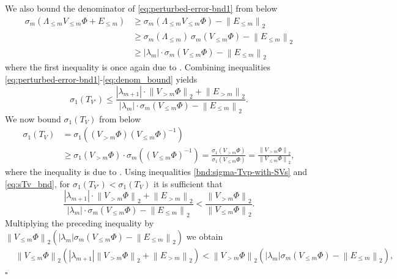 \documentclass[10pt,preprint]{elsarticle}
\newenvironment{proof}{{\noindent \bf \em Proof:}}{\hfill$\square$}
\newcommand{\norm}[1]{\left \lVert #1 \right \rVert }
\newcommand{\Llm}{\Lambda_{\le m}}
\begin{document}
\begin{proof}
%
We also bound the denominator of \eqref{eq:perturbed-error-bnd1} from below 
\begin{equation} \label{eq:denom_bound}
\begin{aligned}
\sigma_m\left(\Llm V_{\leq m} \Phi + E_{\leq m}\right) 
&\geq \sigma_m\left(\Llm V_{\leq m} \Phi\right) - \norm{E_{\leq m}}_2 \\
&\geq \sigma_m(\Llm)\ \sigma_m(V_{\leq m} \Phi)
 - \norm{E_{\leq m}}_2 \\
&\geq |\lambda_m| \cdot \sigma_m(V_{\leq m} \Phi) - \norm{E_{\leq m}}_2
\end{aligned}
\end{equation} 
where the first inequality is once again due to \cite[Theorem 1]{stewart1998perturbation}. Combining inequalities \eqref{eq:perturbed-error-bnd1}-\eqref{eq:denom_bound} yields 
\begin{equation} \label{bnd:sigma-Tvp-with-SVs}
\sigma_1(T_{V'}) \leq \frac{|\lambda_{m+1}| \cdot \norm{V_{>m} \Phi}_2 + \norm{E_{>m}}_2}{|\lambda_m| \cdot \sigma_m(V_{\leq m} \Phi) - \norm{E_{\leq m}}_2}. 
\end{equation}
%
We now bound $\sigma_1(T_V)$ from below 
\begin{equation} \label{eq:sTv_bnd}
\begin{aligned}
\sigma_1(T_V) &= \sigma_1\left((V_{>m}\Phi) (V_{\leq m}\Phi)^{-1}\right) \\ 
&\geq \sigma_1(V_{>m} \Phi) \cdot \sigma_m\left((V_{\leq m}\Phi)^{-1}\right) 
= \frac{\sigma_1(V_{>m} \Phi)}{\sigma_1(V_{\leq m}\Phi)} 
= \frac{\norm{V_{>m} \Phi}_2}{\norm{V_{\leq m} \Phi}_2}, 
\end{aligned}
\end{equation}
where the inequality is due to \cite{wang1992svBounds}. 
%
Using inequalities \eqref{bnd:sigma-Tvp-with-SVs} and \eqref{eq:sTv_bnd}, for $\sigma_1(T_{V'}) < \sigma_1(T_V)$ it is sufficient that 
\begin{equation} 
\frac{|\lambda_{m+1}| \cdot \norm{V_{>m} \Phi}_2 + \norm{E_{>m}}_2}{|\lambda_m| \cdot \sigma_m(V_{\leq m} \Phi) - \norm{E_{\leq m}}_2}
<
\frac{\norm{V_{>m} \Phi}_2}{\norm{V_{\leq m} \Phi}_2}.
\end{equation}
Multiplying the preceding inequality by $\norm{V_{\leq m} \Phi}_2(|\lambda_m| \sigma_m(V_{\leq m} \Phi) - \norm{E_{\leq m}}_2)$ we obtain 
\begin{equation}
\begin{aligned}
&\norm{V_{\leq m} \Phi}_2 \left(|\lambda_{m+1}| \norm{V_{>m} \Phi}_2 + \norm{E_{> m}}_2\right)  < \norm{V_{>m} \Phi}_2 \left(|\lambda_m| \sigma_m(V_{\leq m} \Phi) - \norm{E_{\leq m}}_2\right),

\end{aligned}
\end{equation}
\end{proof}
\end{document}
